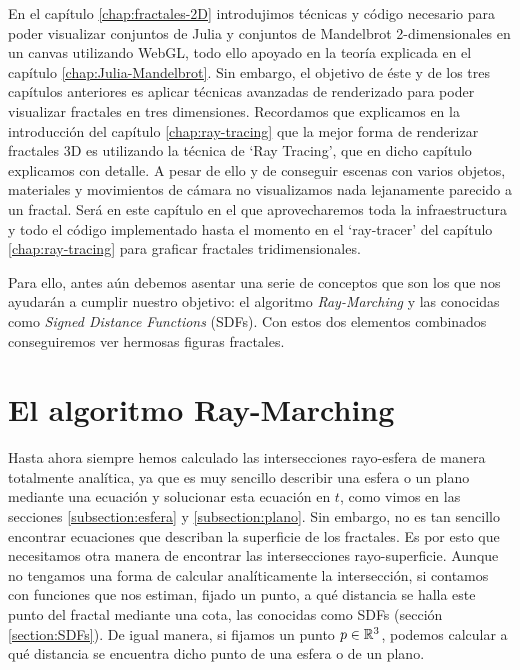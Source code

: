 %
%

En el capítulo \ref{chap:fractales-2D} introdujimos técnicas y código necesario para poder visualizar conjuntos de Julia y conjuntos de Mandelbrot 2-dimensionales en un canvas utilizando WebGL, todo ello apoyado en la teoría explicada en el capítulo \ref{chap:Julia-Mandelbrot}. Sin embargo, el objetivo de éste y de los tres capítulos anteriores es aplicar técnicas avanzadas de renderizado para poder visualizar fractales en tres dimensiones. Recordamos que explicamos en la introducción del capítulo \ref{chap:ray-tracing} que la mejor forma de renderizar fractales 3D es utilizando la técnica de `Ray Tracing', que en dicho capítulo explicamos con detalle. A pesar de ello y de conseguir escenas con varios objetos, materiales y movimientos de cámara no visualizamos nada lejanamente parecido a un fractal. Será en este capítulo en el que aprovecharemos toda la infraestructura y todo el código implementado hasta el momento en el `ray-tracer' del capítulo \ref{chap:ray-tracing} para graficar fractales tridimensionales.

Para ello, antes aún debemos asentar una serie de conceptos que son los que nos ayudarán a cumplir nuestro objetivo: el algoritmo \textit{Ray-Marching} y las conocidas como \textit{Signed Distance Functions} (SDFs). Con estos dos elementos combinados conseguiremos ver hermosas figuras fractales.

\section{El algoritmo Ray-Marching}
\label{section:ray-arching}

Hasta ahora siempre hemos calculado las intersecciones rayo-esfera de manera totalmente analítica, ya que es muy sencillo describir una esfera o un plano mediante una ecuación y solucionar esta ecuación en $t$, como vimos en las secciones \ref{subsection:esfera} y \ref{subsection:plano}. Sin embargo, no es tan sencillo encontrar ecuaciones que describan la superficie de los fractales. Es por esto que necesitamos otra manera de encontrar las intersecciones rayo-superficie. Aunque no tengamos una forma de calcular analíticamente la intersección, si contamos con funciones que nos estiman, fijado un punto, a qué distancia se halla este punto del fractal mediante una cota, las conocidas como SDFs (sección \ref{section:SDFs}). De igual manera, si fijamos un punto $p\in\mathbb{R}^3$, podemos calcular a qué distancia se encuentra dicho punto de una esfera o de un plano. 

